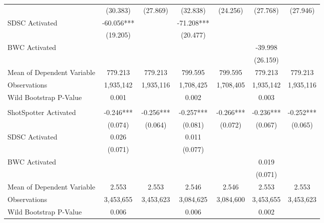 \begin{table}[H]
\begin{threeparttable}
\begin{tabular}[t]{lcccccc}
\hspace{1em} & (30.383) & (27.869) & (32.838) & (24.256) & (27.768) & (27.946)\\
\hspace{1em}SDSC Activated & -60.056*** &  & -71.208*** &  &  & \\
\hspace{1em} & (19.205) &  & (20.477) &  &  & \\
\hspace{1em}BWC Activated &  &  &  &  & -39.998 & \\
\hspace{1em} &  &  &  &  & (26.159) & \\
\hspace{1em}Mean of Dependent Variable & 779.213 & 779.213 & 799.595 & 799.595 & 779.213 & 779.213\\
\hspace{1em}Observations & 1,935,142 & 1,935,116 & 1,708,425 & 1,708,405 & 1,935,142 & 1,935,116\\
\hspace{1em}Wild Bootstrap P-Value & 0.001 &  & 0.002 &  & 0.003 & \\
\addlinespace[0.5cm]
\multicolumn{7}{l}{\textit{Panel C: Arrest Made}}\\
\hspace{1em}ShotSpotter Activated & -0.246*** & -0.256*** & -0.257*** & -0.266*** & -0.236*** & -0.252***\\
\hspace{1em} & (0.074) & (0.064) & (0.081) & (0.072) & (0.067) & (0.065)\\
\hspace{1em}SDSC Activated & 0.026 &  & 0.011 &  &  & \\
\hspace{1em} & (0.071) &  & (0.077) &  &  & \\
\hspace{1em}BWC Activated &  &  &  &  & 0.019 & \\
\hspace{1em} &  &  &  &  & (0.071) & \\
\hspace{1em}Mean of Dependent Variable & 2.553 & 2.553 & 2.546 & 2.546 & 2.553 & 2.553\\
\hspace{1em}Observations & 3,453,655 & 3,453,623 & 3,084,625 & 3,084,600 & 3,453,655 & 3,453,623\\
\hspace{1em}Wild Bootstrap P-Value & 0.006 &  & 0.006 &  & 0.002 & \\

\end{tabular}
\end{threeparttable}
\end{table}
